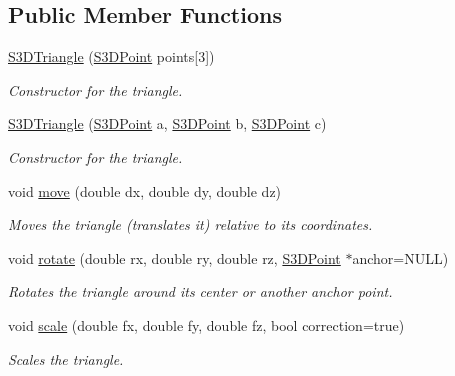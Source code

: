 \subsection*{Public Member Functions}
\begin{DoxyCompactItemize}
\item 
\hyperlink{class_s3_d_triangle_a2ac27d0814934c422e3fbf593c77014e}{S3DTriangle} (\hyperlink{class_s3_d_point}{S3DPoint} points\mbox{[}3\mbox{]})
\begin{DoxyCompactList}\small\item\em Constructor for the triangle. \item\end{DoxyCompactList}\item 
\hyperlink{class_s3_d_triangle_a6709f19586226831dc2a50466e3e669e}{S3DTriangle} (\hyperlink{class_s3_d_point}{S3DPoint} a, \hyperlink{class_s3_d_point}{S3DPoint} b, \hyperlink{class_s3_d_point}{S3DPoint} c)
\begin{DoxyCompactList}\small\item\em Constructor for the triangle. \item\end{DoxyCompactList}\item 
void \hyperlink{class_s3_d_triangle_a7f168122e4ed627fcb6489852a56982b}{move} (double dx, double dy, double dz)
\begin{DoxyCompactList}\small\item\em Moves the triangle (translates it) relative to its coordinates. \item\end{DoxyCompactList}\item 
void \hyperlink{class_s3_d_triangle_a3e739f6c9c176e58cb734db7328cf039}{rotate} (double rx, double ry, double rz, \hyperlink{class_s3_d_point}{S3DPoint} $\ast$anchor=NULL)
\begin{DoxyCompactList}\small\item\em Rotates the triangle around its center or another anchor point. \item\end{DoxyCompactList}\item 
void \hyperlink{class_s3_d_triangle_acad24a5cbc1ab7526df25383dd739f00}{scale} (double fx, double fy, double fz, bool correction=true)
\begin{DoxyCompactList}\small\item\em Scales the triangle. \item\end{DoxyCompactList}\item 

\end{DoxyCompactItemize}
